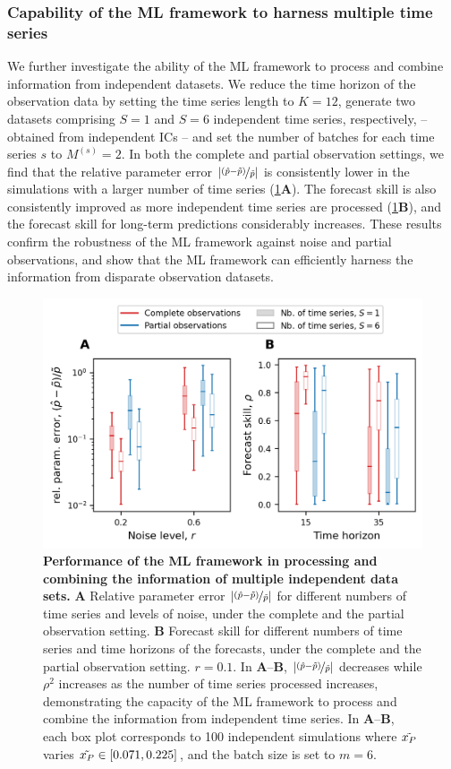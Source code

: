 \subsubsection{Capability of the ML framework to harness multiple time series}
We further investigate the ability of the ML framework to process and combine information from independent datasets. 
%
We reduce the time horizon of the observation data by setting the time series length to $K = 12$, generate two datasets comprising $S = 1$ and $S=6$ independent time series, respectively, -- obtained from independent ICs -- and set the number of batches for each time series $s$ to $M^{(s)} = 2$. In both the complete and partial observation settings, we find that the relative parameter error $|\nicefrac{(\hat p -\Tilde{p})}{\Tilde{p}}|$ is consistently lower in the simulations with a larger number of time series (\cref{fig:perfect_setting_multiple_TS}\textbf{A}). The forecast skill is also consistently improved as more independent time series are processed (\cref{fig:perfect_setting_multiple_TS}\textbf{B}), and the forecast skill for long-term predictions considerably increases.
These results confirm the robustness of the ML framework against noise and partial observations, and show that the ML framework can efficiently harness the information from disparate observation datasets.
%

\begin{figure}[h]
    \centering
    \includegraphics[]{figures/figure4.png}
    \caption{\textbf{Performance of the ML framework in processing and combining the information of multiple independent data sets.}
    \textbf{A} Relative parameter error $|\nicefrac{(\hat p -\Tilde{p})}{\Tilde{p}}|$ for different numbers of time series and levels of noise, under the complete and the partial observation setting. 
    \textbf{B} Forecast skill for different numbers of time series and time horizons of the forecasts, under the complete and the partial observation setting. $r = 0.1$.
    In \textbf{A}--\textbf{B}, $|\nicefrac{(\hat p -\Tilde{p})}{\Tilde{p}}|$ decreases while $\rho^2$ increases as the number of time series processed increases, demonstrating the capacity of the ML framework to process and combine the information from independent time series.
    In \textbf{A}--\textbf{B}, each box plot corresponds to 100 independent simulations where $\Tilde{x_P}$ varies $\Tilde{x_P} \in [0.071, 0.225]$, and the batch size is set to $m = 6$.
    }
    \label{fig:perfect_setting_multiple_TS}
\end{figure}
\FloatBarrier

